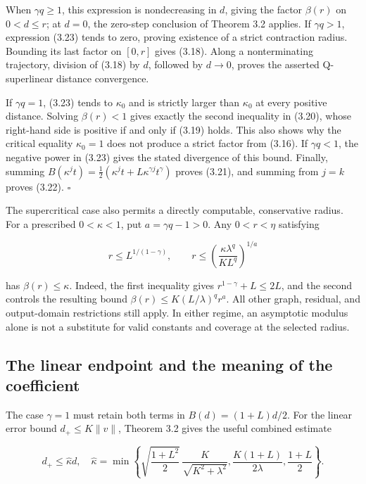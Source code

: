 \documentclass[11pt,a4paper]{article}
\theoremstyle{plain}
\theoremstyle{definition}
\theoremstyle{remark}
\begin{document}
When \(\gamma q\ge1\), this expression is nondecreasing in \(d\), giving
the factor \(\beta(r)\) on \(0<d\le r\); at \(d=0\), the zero-step
conclusion of Theorem 3.2 applies. If \(\gamma q>1\), expression (3.23)
tends to zero, proving existence of a strict contraction radius.
Bounding its last factor on \([0,r]\) gives (3.18). Along a
nonterminating trajectory, division of (3.18) by \(d\), followed by
\(d\to0\), proves the asserted Q-superlinear distance convergence.

If \(\gamma q=1\), (3.23) tends to \(\kappa_0\) and is strictly larger
than \(\kappa_0\) at every positive distance. Solving \(\beta(r)<1\)
gives exactly the second inequality in (3.20), whose right-hand side is
positive if and only if (3.19) holds. This also shows why the critical
equality \(\kappa_0=1\) does not produce a strict factor from (3.16). If
\(\gamma q<1\), the negative power in (3.23) gives the stated divergence
of this bound. Finally, summing
\(B(\kappa^jt)=\tfrac12(\kappa^jt+L\kappa^{\gamma j}t^\gamma)\) proves
(3.21), and summing from \(j=k\) proves (3.22). \(\square\)

The supercritical case also permits a directly computable, conservative
radius. For a prescribed \(0<\kappa<1\), put \(a=\gamma q-1>0\). Any
\(0<r<\eta\) satisfying

\[
r\le L^{1/(1-\gamma)},
\qquad
r\le\left(\frac{\kappa\lambda^q}{K L^q}\right)^{1/a}
\tag{3.24}
\]

has \(\beta(r)\le\kappa\). Indeed, the first inequality gives
\(r^{1-\gamma}+L\le2L\), and the second controls the resulting bound
\(\beta(r)\le K(L/\lambda)^q r^a\). All other graph, residual, and
output-domain restrictions still apply. In either regime, an asymptotic
modulus alone is not a substitute for valid constants and coverage at
the selected radius.

\hypertarget{the-linear-endpoint-and-the-meaning-of-the-coefficient}{%
\subsection{The linear endpoint and the meaning of the
coefficient}\label{the-linear-endpoint-and-the-meaning-of-the-coefficient}}

The case \(\gamma=1\) must retain both terms in \(B(d)=(1+L)d/2\). For
the linear error bound \(d_+\le K\|v\|\), Theorem 3.2 gives the useful
combined estimate

\[
d_+\le\widehat\kappa d,
\quad
\widehat\kappa=
\min\left\{
\sqrt{\frac{1+L^2}{2}}\,
\frac{K}{\sqrt{K^2+\lambda^2}},
\frac{K(1+L)}{2\lambda},
\frac{1+L}{2}
\right\}.
\tag{3.25}
\]
\end{document}
